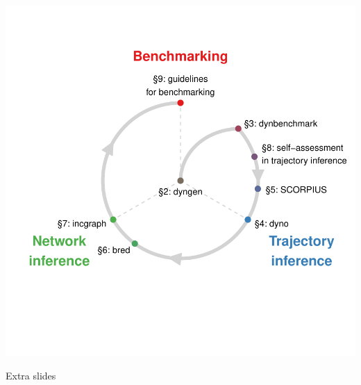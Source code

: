 \documentclass[usepdftitle=false, compress]{beamer}
\begin{document}
\begin{frame}
	\includegraphics[width=\linewidth]{figures/overview.pdf}
\end{frame}

\begin{frame}
	\vfill
	\begin{center}
		\color{mygray}
		{\LARGE Extra slides} 
	\end{center}
	\vfill
\end{frame}
\end{document}
